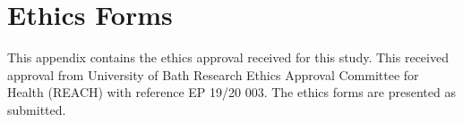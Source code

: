 \chapter{Ethics Forms}
\label{chp:ethics-approval}
This appendix contains the ethics approval received for this study. This received approval from University of
Bath Research Ethics Approval Committee for Health (REACH) with reference EP 19/20 003. The ethics forms are presented as submitted.

